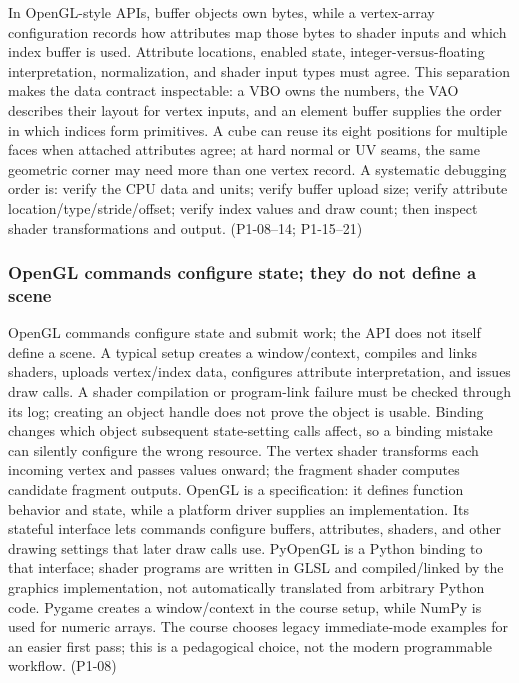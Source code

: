 In OpenGL-style APIs, buffer objects own bytes, while a vertex-array configuration records how attributes map those bytes to shader inputs and which index buffer is used. Attribute locations, enabled state, integer-versus-floating interpretation, normalization, and shader input types must agree. This separation makes the data contract inspectable: a VBO owns the numbers, the VAO describes their layout for vertex inputs, and an element buffer supplies the order in which indices form primitives. A cube can reuse its eight positions for multiple faces when attached attributes agree; at hard normal or UV seams, the same geometric corner may need more than one vertex record. A systematic debugging order is: verify the CPU data and units; verify buffer upload size; verify attribute location/type/stride/offset; verify index values and draw count; then inspect shader transformations and output. (P1-08--14; P1-15--21)

\subsubsection{OpenGL commands configure state; they do not define a scene}\label{03-visual-computing-i-ch018-opengl-commands-configure-state-they-do-not-define-a-scene}

\hypertarget{03-visual-computing-i-ch018-opengl-commands-configure-state-they-do-not-define-a-scene}{}

OpenGL commands configure state and submit work; the API does not itself define a scene. A typical setup creates a window/context, compiles and links shaders, uploads vertex/index data, configures attribute interpretation, and issues draw calls. A shader compilation or program-link failure must be checked through its log; creating an object handle does not prove the object is usable. Binding changes which object subsequent state-setting calls affect, so a binding mistake can silently configure the wrong resource. The vertex shader transforms each incoming vertex and passes values onward; the fragment shader computes candidate fragment outputs. OpenGL is a specification: it defines function behavior and state, while a platform driver supplies an implementation. Its stateful interface lets commands configure buffers, attributes, shaders, and other drawing settings that later draw calls use. PyOpenGL is a Python binding to that interface; shader programs are written in GLSL and compiled/linked by the graphics implementation, not automatically translated from arbitrary Python code. Pygame creates a window/context in the course setup, while NumPy is used for numeric arrays. The course chooses legacy immediate-mode examples for an easier first pass; this is a pedagogical choice, not the modern programmable workflow. (P1-08)

